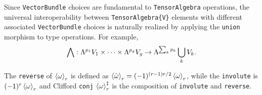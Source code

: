 \documentclass{juliacon}
\begin{document}



Since \verb`VectorBundle` choices are fundamental to \verb`TensorAlgebra` operations, the universal interoperability between \verb`TensorAlgebra{V}` elements with different associated \verb`VectorBundle` choices is naturally realized by applying the \verb`union` morphism to type operations.
For example, $$\bigwedge :\Lambda^{p_1}V_1\times\dots\times\Lambda^{p_g}V_g \rightarrow \Lambda^{\sum_kp_k}\bigcup_k V_k.$$

\begin{definition}
	The \verb`reverse` of $\left\langle \omega \right\rangle_r$ is defined as $\left\langle \tilde\omega \right\rangle_r = (-1)^{(r-1)r/2}\left\langle \omega \right\rangle_r$, while the \verb`involute` is $(-1)^r\left\langle \omega \right\rangle_r$ and Clifford \verb`conj`  $\left\langle \omega \right\rangle_r^\ddagger$ is the composition of \verb`involute` and \verb`reverse`.
\end{definition}
\end{document}
